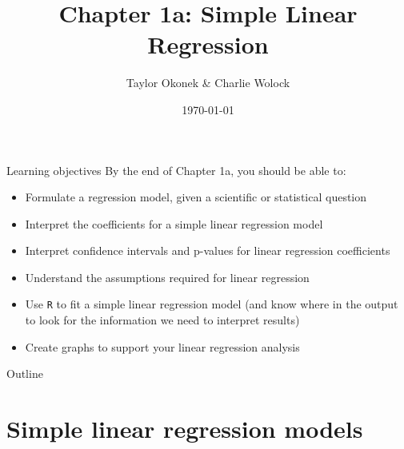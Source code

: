 \documentclass[10pt,t]{beamer}
\title{Chapter 1a: Simple Linear Regression}
\author{Taylor Okonek \& Charlie Wolock}
\date{\today}
\begin{document}
	\begin{frame}
	\titlepage 
\end{frame}

\begin{frame}{Learning objectives}
By the end of Chapter 1a, you should be able to:
\begin{itemize}
	\item Formulate a regression model, given a scientific or statistical question
	\item Interpret the coefficients for a simple linear regression model
	\item Interpret confidence intervals and p-values for linear regression coefficients
	\item Understand the assumptions required for linear regression
	\item Use \texttt{R} to fit a simple linear regression model (and know where in the output to look for the information we need to interpret results)
	\item Create graphs to support your linear regression analysis
\end{itemize}
\end{frame}

\begin{frame}{Outline}
\tableofcontents
\end{frame}



\section{Simple linear regression models}
\end{document}
